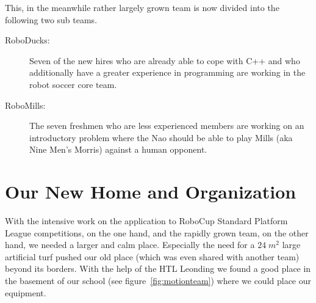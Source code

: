 \documentclass[11pt]{article}
\begin{document}
This, in the meanwhile rather largely grown team is now divided into the following two sub teams.

\begin{description}
	\item[RoboDucks:] Seven of the new hires who are already able to cope with C++ and who additionally have a greater experience in programming are working in the robot soccer core team.
	\item[RoboMills:] The seven freshmen who are less experienced members are working on an introductory problem where the Nao should be able to play Mills (aka Nine Men's Morris) against a human opponent.
\end{description}

\section{Our New Home and Organization}
With the intensive work on the application to RoboCup Standard Platform League competitions, on the one hand, and the rapidly grown team, on the other hand, we needed a larger and calm place. Especially the need for a $24 \; m^2$ large artificial turf pushed our old place (which was even shared with another team) beyond its borders. With the help of the HTL Leonding we found a good place in the basement of our school (see figure~\ref{fig:motionteam}) where we could place our equipment.
\end{document}

